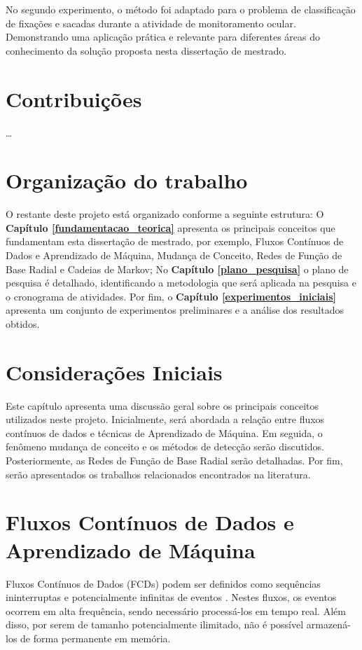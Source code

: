 \documentclass[msc, classic, a4paper]{ufbathesis}
\begin{document}
No segundo experimento,
o método foi adaptado para o problema de classificação de fixações e sacadas durante a atividade de monitoramento ocular.
Demonstrando uma aplicação prática e relevante para diferentes áreas do conhecimento da solução proposta nesta dissertação de mestrado.

\section{Contribuições}

\ldots

\section{Organização do trabalho}

O restante deste projeto está organizado conforme a seguinte estrutura:
%
O \textbf{Capítulo \ref{fundamentacao_teorica}} apresenta os principais conceitos que fundamentam esta dissertação de mestrado,
por exemplo, Fluxos Contínuos de Dados e Aprendizado de Máquina, Mudança de Conceito, Redes de Função de Base Radial e Cadeias de Markov;
%
No \textbf{Capítulo \ref{plano_pesquisa}} o plano de pesquisa é detalhado, identificando a metodologia que será aplicada na pesquisa e o cronograma de atividades.
%
Por fim, o \textbf{Capítulo \ref{experimentos_iniciais}} apresenta um conjunto de experimentos preliminares e a análise dos resultados obtidos.

 \label{fundamentacao_teorica}
\section{Considerações Iniciais}

Este capítulo apresenta uma discussão geral sobre os principais conceitos utilizados neste projeto.
%
Inicialmente, será abordada a relação entre fluxos contínuos de dados e técnicas de Aprendizado de Máquina.
%
Em seguida, o fenômeno mudança de conceito e os métodos de detecção serão discutidos.
%
Posteriormente, as Redes de Função de Base Radial serão detalhadas.
%
Por fim, serão apresentados os trabalhos relacionados encontrados na literatura.

\section{Fluxos Contínuos de Dados e Aprendizado de Máquina}

Fluxos Contínuos de Dados (FCDs) podem ser definidos como sequências ininterruptas e potencialmente infinitas de eventos \cite{Aggarwal:2006:DSM:1196418}.
%
Nestes fluxos, os eventos ocorrem em alta frequência, sendo necessário processá-los em tempo real.
%
Além disso, por serem de tamanho potencialmente ilimitado, não é possível armazená-los de forma permanente em memória.
%
\end{document}
